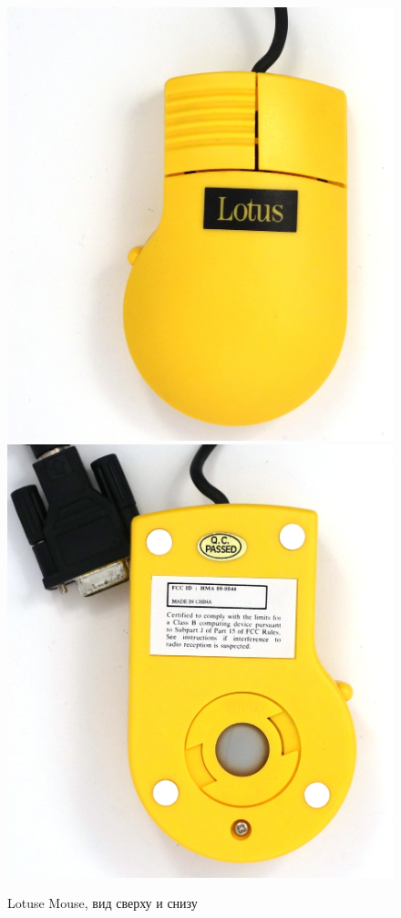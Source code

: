 \documentclass[11pt, a4paper]{article}
\begin{document}
\begin{figure}[h]
    \centering
    \includegraphics[scale=0.3]{1992_lotus_mouse/top_30.jpg}
    \includegraphics[scale=0.3]{1992_lotus_mouse/bottom_30.jpg}
    \caption{Lotuse Mouse, вид сверху и снизу}
    \label{fig:LotusTopBottom}
\end{figure}
\end{document}
